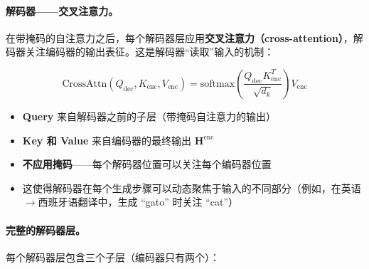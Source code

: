 \paragraph{解码器——交叉注意力。}
\label{decoder-cross-attention.}

在带掩码的自注意力之后，每个解码器层应用\textbf{交叉注意力（cross-attention）}，解码器关注编码器的输出表征。这是解码器``读取''输入的机制：

\begin{equation}
  \text{CrossAttn}(Q_{\text{dec}}, K_{\text{enc}}, V_{\text{enc}}) = \text{softmax}\!\left(\frac{Q_{\text{dec}} K_{\text{enc}}^T}{\sqrt{d_k}}\right) V_{\text{enc}}
\end{equation}

\begin{itemize}
  \item \textbf{Query} 来自解码器之前的子层（带掩码自注意力的输出）
  \item \textbf{Key 和 Value} 来自编码器的最终输出 $\mathbf{H}^{\text{enc}}$
  \item \textbf{不应用掩码}——每个解码器位置可以关注每个编码器位置
  \item 这使得解码器在每个生成步骤可以动态聚焦于输入的不同部分（例如，在英语$\to$西班牙语翻译中，生成 ``gato'' 时关注 ``cat''）
\end{itemize}

\paragraph{完整的解码器层。}
\label{full-decoder-layer.}

每个解码器层包含三个子层（编码器只有两个）：

